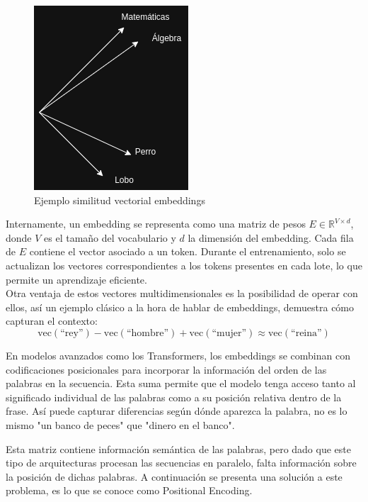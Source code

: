 \documentclass[11pt]{book}
\theoremstyle{plain}
\theoremstyle{definition}
\begin{document}
\begin{figure}[h]
    \centering
    \includegraphics[width=0.5\linewidth]{img/ejemplo_embedding.png}
    \caption{Ejemplo similitud vectorial embeddings}
    \label{fig:placeholder6}
\end{figure}

Internamente, un embedding se representa como una matriz de pesos $E \in \mathbb{R}^{V \times d}$, donde $V$ es el tamaño del vocabulario y $d$ la dimensión del embedding. Cada fila de $E$ contiene el vector asociado a un token. Durante el entrenamiento, solo se actualizan los vectores correspondientes a los tokens presentes en cada lote, lo que permite un aprendizaje eficiente.\\

Otra ventaja de estos vectores multidimensionales es la posibilidad de operar con ellos, así un ejemplo clásico a la hora de hablar de embeddings, demuestra cómo capturan el contexto: 
\[
\text{vec}(\text{``rey''}) - \text{vec}(\text{``hombre''}) + \text{vec}(\text{``mujer''}) \approx \text{vec}(\text{``reina''})
\]

En modelos avanzados como los Transformers, los embeddings se combinan con codificaciones posicionales para incorporar la información del orden de las palabras en la secuencia. Esta suma permite que el modelo tenga acceso tanto al significado individual de las palabras como a su posición relativa dentro de la frase. Así puede capturar diferencias según dónde aparezca la palabra, no es lo mismo "un banco de peces" que "dinero en el banco".\parencite{perez_embeddings}

Esta matriz contiene información semántica de las palabras, pero dado que este tipo de arquitecturas procesan las secuencias en paralelo,  falta información sobre la posición de dichas palabras. A continuación se presenta una solución a este problema, es lo que se conoce como Positional Encoding. 
\end{document}
